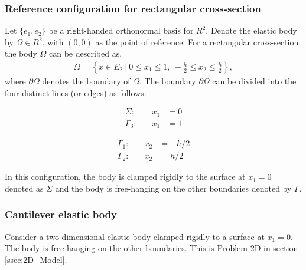\subsubsection{Reference configuration for rectangular cross-section}\label{sssec:2D_Model:RefConf}
Let $\{e_1,e_2\}$ be a right-handed orthonormal basis for $R^2$. Denote the elastic body by $\Omega \in R^2$, with $(0,0)$ as the point of reference. For a rectangular cross-section, the body $\Omega$ can be described as,
\begin{eqnarray*}
	\Omega = \left \{ x \in E_2 \ | \ 0 \leq x_1 \leq 1, \ -\frac{h}{2} \leq x_2 \leq \frac{h}{2} \right \},
\end{eqnarray*} where $\partial \Omega$ denotes the boundary of $\Omega$. The boundary $\partial \Omega$ can be divided into the four distinct lines (or edges) as follows: \label{sym:En}

\noindent\begin{minipage}{.5\linewidth}
	\begin{eqnarray*}
		\Sigma:& \quad x_1 &= 0\\
		\Gamma_3:& \quad x_1 &= 1
	\end{eqnarray*}
\end{minipage}%
\begin{minipage}{.5\linewidth}
	\begin{eqnarray*}
		\Gamma_1:& \quad x_2 &= -{h}/{2}\\
		\Gamma_2:& \quad x_2 &= {h}/{2}
	\end{eqnarray*}
\end{minipage}

In this configuration, the body is clamped rigidly to the surface at $x_1 = 0$ denoted as $\Sigma$ and the body is free-hanging on the other boundaries denoted by $\Gamma$.

\subsubsection{Cantilever elastic body}
Consider a two-dimensional elastic body clamped rigidly to a surface at $x_1 = 0$. The body is free-hanging on the other boundaries. This is Problem 2D in section \ref{ssec:2D_Model}.

\FloatBarrier

